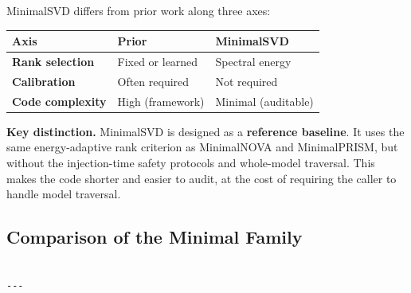 MinimalSVD differs from prior work along three axes:

\begin{table}[H]
\centering
\small
\begin{tabular}{lll}
\toprule
\textbf{Axis} & \textbf{Prior} & \textbf{MinimalSVD} \\
\midrule
\textbf{Rank selection} & Fixed or learned & Spectral energy \\
\textbf{Calibration} & Often required & Not required \\
\textbf{Code complexity} & High (framework) & Minimal (auditable) \\
\bottomrule
\end{tabular}
\end{table}

\textbf{Key distinction.} MinimalSVD is designed as a \textbf{reference baseline}. It 
uses the same energy-adaptive rank criterion as MinimalNOVA and MinimalPRISM, 
but without the injection-time safety protocols and whole-model traversal. 
This makes the code shorter and easier to audit, at the cost of requiring 
the caller to handle model traversal.



\subsection{Comparison of the Minimal Family}

\begin{lstlisting}

---
\end{lstlisting}